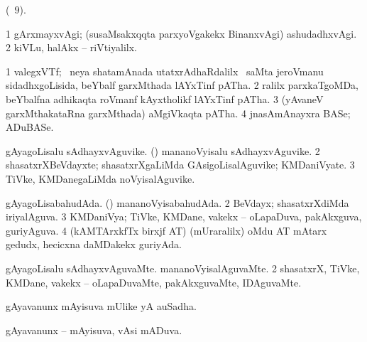 {{{{{{{{{{{{{{\bentry
{}
\gl{\nA}
\expl{}
\bmng
  (\pagu\ $9$). 
\emng
\eentry

\bentry
{} 
\gl{\kirxvi}
\expl{}
\bmng
\bnum
\num{1} gArxmayxvAgi; (susaMsakxqqta parxyoVgakekx BinanxvAgi) ashudadhxvAgi. 
\num{2} kiVLu, halAkx -- riVtiyalilx. 
\enum
\emng
\eentry

\bentry 
{} 
\gl{\nA}
\expl{}
\bmng
\bnum
\num{1} valegxVTf; \kirxsha\ neya shatamAnada utatxrAdhaRdalilx \kanmu\ saMta jeroVmanu sidadhxgoLisida, beYbalf garxMthada lAYxTinf pATha. 
\num{2} ralilx parxkaTgoMDa, beYbalfna adhikaqta roVmanf kAyxtholikf lAYxTinf pATha. 
\num{3}  (yAvaneV garxMthakataRna garxMthada) aMgiVkaqta pATha. 
\num{4}  jnasAmAnayxra BASe; ADuBASe. 
\enum
\emng
\eentry

\bentry 
{} 
\gl{\nA}
\expl{}
\bmng
\bnum
{} 
\banum
{} gAyagoLisalu sAdhayxvAguvike. 
 (\rUpa) mananoVyisalu sAdhayxvAguvike. 
\eanum
\numie
\num{2} shasatxrXBeVdayxte; shasatxrXgaLiMda GAsigoLisalAguvike; KMDaniVyate. 
\num{3} TiVke, KMDanegaLiMda noVyisalAguvike. 
\enum
\emng
\eentry

\bentry
{} 
\gl{\gu}
\expl{}
\bmng
\bnum
{} 
\banum
{} gAyagoLisabahudAda. 
 (\rUpa) mananoVyisabahudAda. 
\eanum
\numie
\num{2} BeVdayx; shasatxrXdiMda iriyalAguva. 
\num{3} KMDaniVya; TiVke, KMDane, \mo vakekx -- oLapaDuva, pakAkxguva, guriyAguva. 
\num{4} (kAMTArxkfTx birxjf AT) (mUraralilx) oMdu AT mAtarx gedudx, hecicxna daMDakekx guriyAda. 
\enum
\emng
\eentry

\bentry 
{} 
\gl{\nA}
\expl{}
\bmng
\emng
\eentry

\bentry
{} 
\gl{\kirxvi}
\expl{}
\bmng
\bnum
{} 
\banum
{} gAyagoLisalu sAdhayxvAguvaMte. 
 mananoVyisalAguvaMte. 
\eanum
\numie
\num{2} shasatxrX, TiVke, KMDane, \mo vakekx -- oLapaDuvaMte, pakAkxguvaMte, IDAguvaMte. 
\enum
\emng
\eentry

\bentry 
{} 
\gl{\nA}
\bmng
 gAyavanunx mAyisuva mUlike yA auSadha. 
\emng
\eentry

\bentry
{} 
\gl{\gu}
\expl{}
\bmng
 gAyavanunx -- mAyisuva, vAsi mADuva. 
\emng
\eentry

}}}}}}}}}}}}}}
